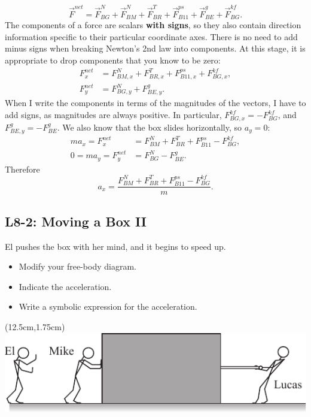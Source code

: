 \documentclass[]{article}
\begin{document}
\begin{TeacherMargin}
\[
\vec{F}^{net} = \vec{F}^{N}_{BG} + \vec{F}^{N}_{BM} + \vec{F}^{T}_{BR} + \vec{F}^{ps}_{B11} + \vec{F}^{g}_{BE} + \vec{F}^{kf}_{BG}.
\]
The components of a force are scalars \textbf{with signs}, so they also contain direction information specific to their particular coordinate axes. There is no need to add minus signs when breaking Newton's 2nd law into components. At this stage, it is appropriate to drop components that you know to be zero:
\begin{align*}
	F^{net}_{x} & = F^{N}_{BM,x} + F^{T}_{BR,x} + F^{ps}_{B11,x} + F^{kf}_{BG,x}, \\
	F^{net}_{y} & = F^{N}_{BG,y} + F^{g}_{BE,y}.
\end{align*}
When I write the components in terms of the magnitudes of the vectors, I have to add signs, as magnitudes are always positive. In particular, $F^{kf}_{BG,x} = -F^{kf}_{BG}$, and $F^{g}_{BE,y} = -F^{g}_{BE}$. We also know that the box slides horizontally, so $a_{y}=0$:
\begin{align*}
	ma_{x} = F^{net}_{x} & = F^{N}_{BM} + F^{T}_{BR} + F^{ps}_{B11} - F^{kf}_{BG}, \\
	0 = ma_{y} = F^{net}_{y} & = F^{N}_{BG} - F^{g}_{BE}.
\end{align*}
Therefore
\[
a_{x} = \frac{F^{N}_{BM} + F^{T}_{BR} + F^{ps}_{B11}-F^{kf}_{BG}}{m}.
\]
\end{TeacherMargin}
\begin{PresentSpace}
\vspace{-10pt}
\section*{L8-2: Moving a Box II}
\vspace{100pt}
El pushes the box with her mind, and it begins to speed up.
\begin{itemize}
	\item Modify your free-body diagram.
	\item Indicate the acceleration.
	\item Write a symbolic expression for the acceleration.
\end{itemize}
\end{PresentSpace}
\begin{textblock*}{5cm}(12.5cm,1.75cm)
\centering
\includegraphics[scale=1.5]{Eleven_Helps_Mike_and_Lucas_Push_a_Box.pdf}
\end{textblock*}
\end{document}
